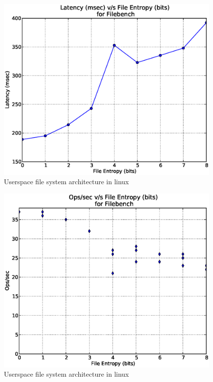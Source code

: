 \begin{figure}
\label{fig:fuse}
\begin{center}
\includegraphics[scale=.55]{../results/write_latency_avg.eps}
\caption{Userspace file system architecture in linux\cite{web:wiki-fuse}}
\end{center}
\end{figure}

\begin{figure}
\label{fig:fuse}
\begin{center}
\includegraphics[scale=.55]{../results/write_ops_all.eps}
\caption{Userspace file system architecture in linux\cite{web:wiki-fuse}}
\end{center}
\end{figure}


